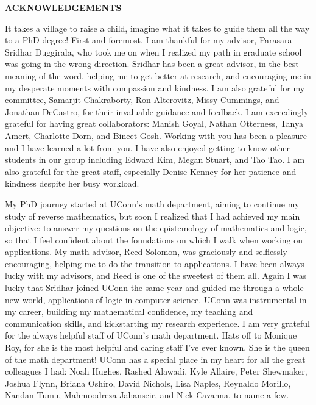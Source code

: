 
\begin{center}
\vspace*{52pt}
{\textbf{ACKNOWLEDGEMENTS}}
\end{center}

It takes a village to raise a child, imagine what it takes to guide them all the way to a PhD degree!
%
First and foremost, I am thankful for my advisor, Parasara Sridhar Duggirala, who took me on when I realized my path in graduate school was going in the wrong direction.
%
Sridhar has been a great advisor, in the best meaning of the word, helping me to get better at research, and encouraging me in my desperate moments with compassion and kindness.
%
I am also grateful for my committee, Samarjit Chakraborty, Ron Alterovitz, Missy Cummings, and Jonathan DeCastro, for their invaluable guidance and feedback.
%
I am exceedingly grateful for having great collaborators: Manish Goyal, Nathan Otterness, Tanya Amert, Charlotte Dorn, and Bineet Gosh.
%
Working with you has been a pleasure and I have learned a lot from you.
%
I have also enjoyed getting to know other students in our group including Edward Kim, Megan Stuart, and Tao Tao.
%
I am also grateful for the great staff, especially Denise Kenney for her patience and kindness despite her busy workload.


My PhD journey started at UConn's math department, aiming to continue my study of reverse mathematics, but soon I realized that I had achieved my main objective: to answer my questions on the epistemology of mathematics and logic, so that I feel confident about the foundations on which I walk when working on applications.
%
My math advisor, Reed Solomon, was graciously and selflessly encouraging, helping me to do the transition to applications.
%
I have been always lucky with my advisors, and Reed is one of the sweetest of them all.
%
Again I was lucky that Sridhar joined UConn the same year and guided me through a whole new world, applications of logic in computer science.
%
UConn was instrumental in my career, building my mathematical confidence, my teaching and communication skills, and kickstarting my research experience.
%
I am very grateful for the always helpful staff of UConn's math department.
%
Hats off to Monique Roy, for she is the most helpful and caring staff I've ever known.
%
She is the queen of the math department!
%
UConn has a special place in my heart for all the great colleagues I had: Noah Hughes, Rashed Alawadi, Kyle Allaire, Peter Shewmaker, Joshua Flynn, Briana Oshiro, David Nichols, Lisa Naples, Reynaldo Morillo, Nandan Tumu, Mahmoodreza Jahanseir, and Nick Cavanna, to name a few.
%


\clearpage
